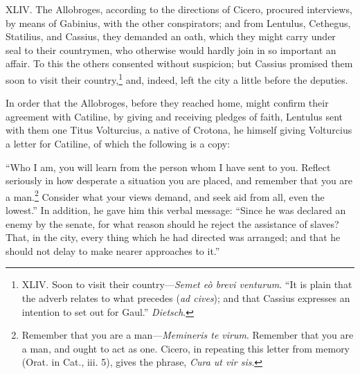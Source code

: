 XLIV. The Allobroges, according to the directions of Cicero, procured
interviews, by means of Gabinius, with the other conspirators; and
from Lentulus, Cethegus, Statilius, and Cassius, they demanded an
oath, which they might carry under seal to their countrymen, who
otherwise would hardly join in so important an affair. To this the
others consented without suspicion; but Cassius promised them soon to
visit their country,\footnote{XLIV. Soon to visit their country—\emph{Semet eò brevi venturum}.
``It is plain that the adverb relates to what precedes (\emph{ad cives});
and that Cassius expresses an intention to set out for Gaul.'' \emph{Dietsch}.} and, indeed, left the city a little before
the deputies.

In order that the Allobroges, before they reached home, might confirm
their agreement with Catiline, by giving and receiving pledges of
faith, Lentulus sent with them one Titus Volturcius, a native of
Crotona, he himself giving Volturcius a letter for Catiline, of which
the following is a copy:

``Who I am, you will learn from the person whom I have sent to you.
Reflect seriously in how desperate a situation you are placed, and
remember that you are a man.\footnote{Remember that you are a man—\emph{Memineris te virum}. Remember
that you are a man, and ought to act as one. Cicero, in repeating this
letter from memory (Orat. in Cat., iii. 5), gives the phrase, \emph{Cura ut
vir sis}.} Consider what your views demand, and
seek aid from all, even the lowest.'' In addition, he gave him this
verbal message: ``Since he was declared an enemy by the senate, for
what reason should he reject the assistance of slaves? That, in the
city, every thing which he had directed was arranged; and that he
should not delay to make nearer approaches to it.''

